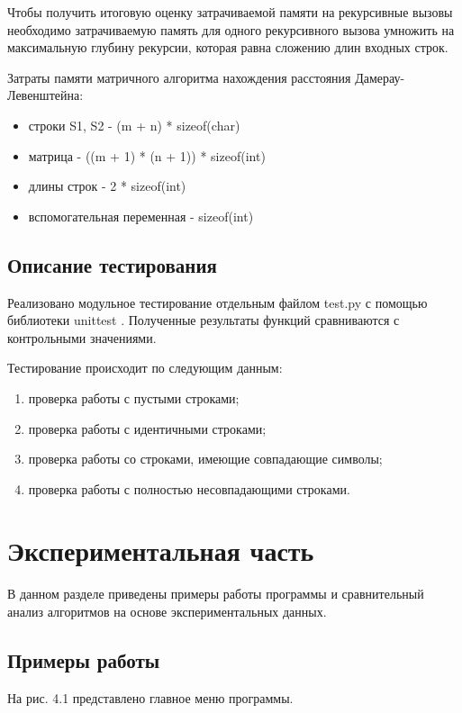 \documentclass[12pt]{report}
\begin{document}
 Чтобы получить итоговую оценку затрачиваемой памяти на рекурсивные вызовы необходимо затрачиваемую память для одного рекурсивного вызова умножить на максимальную глубину рекурсии, которая равна сложению длин входных строк.\vspace{\baselineskip}

Затраты памяти матричного алгоритма нахождения расстояния Дамерау-Левенштейна:\begin{itemize}
	\item строки S1, S2 - (m + n) * sizeof(char)
	\item матрица - ((m + 1) * (n + 1)) * sizeof(int)
	\item длины строк - 2 * sizeof(int)
	\item вспомогательная переменная  - sizeof(int)
\end{itemize}

\section{Описание тестирования}
Реализовано модульное тестирование отдельным файлом test.py с помощью библиотеки unittest \cite{unittest}. Полученные результаты функций сравниваются с контрольными значениями. \vspace{\baselineskip}

Тестирование происходит по следующим данным:
\begin{enumerate}
	\item проверка работы с пустыми строками;
	\item проверка работы с идентичными строками;
	\item проверка работы со строками, имеющие совпадающие символы;
	\item проверка работы с полностью несовпадающими строками.
\end{enumerate}

\chapter{Экспериментальная часть}

В данном разделе приведены примеры работы программы и сравнительный анализ алгоритмов на основе экспериментальных данных. 

\section{Примеры работы} 
 
На рис. 4.1 представлено главное меню программы. 
\end{document}
